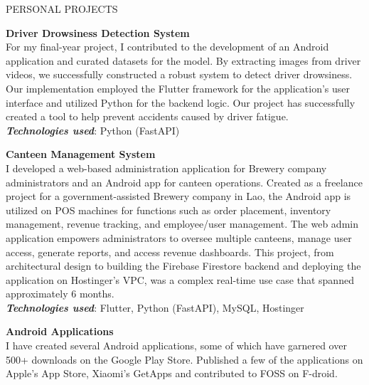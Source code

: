 \documentclass{template}
\begin{document}
\begin{rSection}{PERSONAL PROJECTS}


\textbf{Driver Drowsiness Detection System} \\
For my final-year project, I contributed to the development of an Android application and curated datasets for the model. By extracting images from driver videos, we successfully constructed a robust system to detect driver drowsiness. Our implementation employed the Flutter framework for the application's user interface and utilized Python for the backend logic. Our project has successfully created a tool to help prevent accidents caused by driver fatigue. \\
\textbf{\textit{Technologies used}}: Python (FastAPI)

\textbf{Canteen Management System} \\
I developed a web-based administration application for Brewery company administrators and an Android app for canteen operations. Created as a freelance project for a government-assisted Brewery company in Lao, the Android app is utilized on POS machines for functions such as order placement, inventory management, revenue tracking, and employee/user management. The web admin application empowers administrators to oversee multiple canteens, manage user access, generate reports, and access revenue dashboards. This project, from architectural design to building the Firebase Firestore backend and deploying the application on Hostinger's VPC, was a complex real-time use case that spanned approximately 6 months. \\
\textbf{\textit{Technologies used}}: Flutter, Python (FastAPI), MySQL, Hostinger

\textbf{Android Applications} \\
I have created several Android applications, some of which have garnered over 500+ downloads on the Google Play Store. Published a few of the applications on Apple's App Store, Xiaomi's GetApps and contributed to FOSS on F-droid.

\end{rSection}
\end{document}
